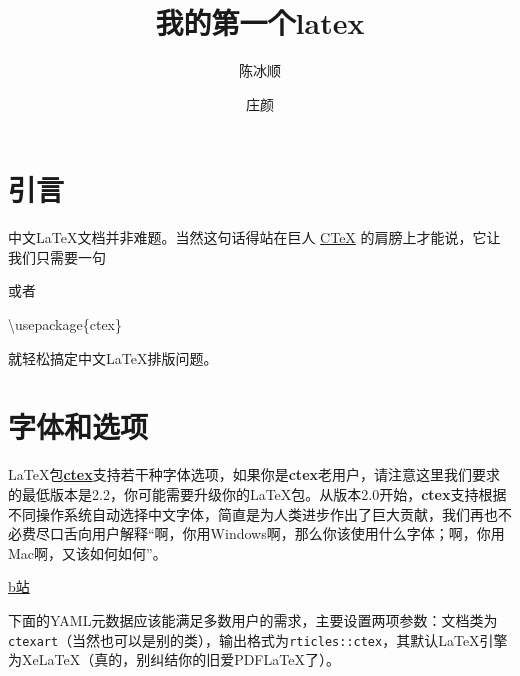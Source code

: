 \documentclass[
]{ctexart}
\title{我的第一个latex}
\author{陈冰顺 \and 庄颜}
\date{}
\newenvironment{Shaded}{\begin{snugshade}}{\end{snugshade}}
\newcommand{\BuiltInTok}[1]{#1}
\newcommand{\CommentTok}[1]{\textcolor[rgb]{0.56,0.35,0.01}{\textit{#1}}}
\newcommand{\ExtensionTok}[1]{#1}
\newcommand{\NormalTok}[1]{#1}
\begin{document}
\maketitle

{
\setcounter{tocdepth}{2}
\tableofcontents
}
\hypertarget{ux5f15ux8a00}{%
\section{引言}\label{ux5f15ux8a00}}

中文LaTeX文档并非难题。当然这句话得站在巨人 \href{http://ctex.org}{CTeX}
的肩膀上才能说，它让我们只需要一句

\begin{Shaded}
\end{Shaded}

或者

\begin{Shaded}
\begin{Highlighting}[]
\BuiltInTok{\textbackslash{}usepackage}\NormalTok{\{}\ExtensionTok{ctex}\NormalTok{\}}
\end{Highlighting}
\end{Shaded}

就轻松搞定中文LaTeX排版问题。

\hypertarget{ux5b57ux4f53ux548cux9009ux9879}{%
\section{字体和选项}\label{ux5b57ux4f53ux548cux9009ux9879}}

LaTeX包\href{http://ctan.org/pkg/ctex}{\textbf{ctex}}支持若干种字体选项，如果你是\textbf{ctex}老用户，请注意这里我们要求的最低版本是2.2，你可能需要升级你的LaTeX包。从版本2.0开始，\textbf{ctex}支持根据不同操作系统自动选择中文字体，简直是为人类进步作出了巨大贡献，我们再也不必费尽口舌向用户解释``啊，你用Windows啊，那么你该使用什么字体；啊，你用Mac啊，又该如何如何''。

\href{https://www.bilibili.com/video/BV1ib4y1X7r9?p=7}{b站}

下面的YAML元数据应该能满足多数用户的需求，主要设置两项参数：文档类为\texttt{ctexart}（当然也可以是别的类），输出格式为\texttt{rticles::ctex}，其默认LaTeX引擎为XeLaTeX（真的，别纠结你的旧爱PDFLaTeX了）。
\end{document}
